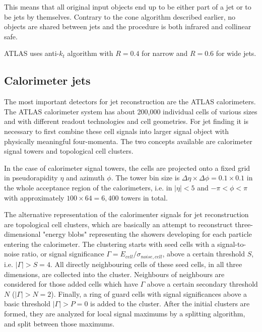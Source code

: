 This means that all original input objects end up to be either part of a jet or
to be jets by themselves. Contrary to the cone algorithm described earlier, no
objects are shared between jets and the procedure is both infrared and collinear
safe.

ATLAS uses anti-$k_t$ algorithm with $R=0.4$ for narrow and $R=0.6$ for wide
jets.

\subsection{Calorimeter jets}
\label{sse:CalorimeterJets}

The most important detectors for jet reconstruction are the ATLAS calorimeters.
The ATLAS calorimeter system has about 200,000 individual cells of various sizes
and with different readout technologies and cell geometries. For jet finding it
is necessary to first combine these cell signals into larger signal object with
physically meaningful four-momenta. The two concepts available are calorimeter
signal towers and topological cell clusters.

In the case of calorimeter signal towers, the cells are projected onto a fixed
grid in pseudorapidity $\eta$ and azimuth $\phi$. The tower bin size is $\Delta
\eta \times \Delta \phi = 0.1 \times 0.1$ in the whole acceptance region of the
calorimeters, i.e. in $|\eta| < 5$ and $- \pi < \phi < \pi$ with approximately 
$100 \times 64 = 6,400$ towers in total.

The alternative representation of the calorimenter signals for jet
reconstruction are topological cell clusters, which are basically an attempt to
reconstruct three-dimensional "energy blobs" representing the showers developing
for each particle entering the calorimeter. The clustering starts with seed
cells with a signal-to-noise ratio, or signal significance $\Gamma = E_{cell} /
\sigma_{noise,cell}$, above a certain threshold $S$, i.e. $|\Gamma| > S = 4$.
All directly neighbouring cells of these seed cells, in all three dimensions,
are collected into the cluster. Neighbours of neighbours are considered for
those added cells which have $\Gamma$ above a certain secondary threshold $N$
($|\Gamma| > N = 2$). Finally, a ring of guard cells with signal significances
above a basic threshold $|\Gamma| > P = 0$ is added to the cluster. After the
initial clusters are formed, they are analyzed for local signal maximums by a
splitting algorithm, and split between those maximums.
